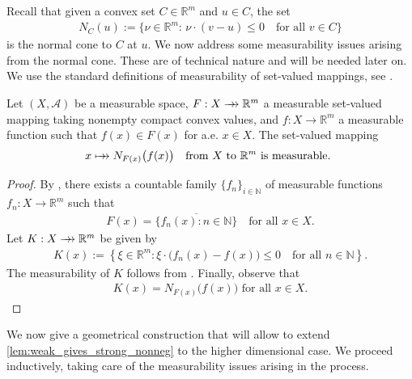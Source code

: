 \documentclass[hidelinks,onefignum,onetabnum]{siamart220329}
\newcommand{\rrightarrow}{\mathrel{\mathrlap{\rightarrow}\mkern1mu\rightarrow}}
\let\twoheadrightarrow\rrightarrow
\newcommand{\mapsmto}{\mathrel{\mathrlap{\mapsto}\mkern1mu\rightarrow}}
\begin{document}
Recall that given a convex set $C\in\mathbb R^m$ and $u\in C$, the set 
	\begin{align*}
		N_{C}(u):=\{\nu\in\mathbb R^m:\, \nu\cdot (v-u)\le0\quad\text{for all $v\in C$}\}
	\end{align*}
	is the normal cone to $C$ at $u$. We now address some measurability issues arising from the normal cone. These are of  technical nature and will be needed later on. 
	We use the standard definitions of measurability of set-valued mappings, see  \cite[Definition 6.2.1]{Anhand}.
\begin{lemma}\label{measissues}
		Let $(X,\mathcal A)$ be a measurable space,  $F:X\twoheadrightarrow \mathbb R^m$ a measurable set-valued mapping taking nonempty compact convex values, and $f:X\to\mathbb R^m$ a measurable function such that $f(x)\in F(x)$ for a.e. $x\in X$.
		The set-valued mapping 
	\begin{align*}
		x\mapsmto N_{F(x)}\big(f(x)\big)\quad \text{from $X$ to $\mathbb R^m$ is measurable. }
	\end{align*}
\end{lemma}
\begin{proof}
	By \cite[Corollary 18.15]{Infdim}, there exists a countable family $\{f_{n}\}_{i\in\mathbb N}$ of measurable functions $f_n:X\to\mathbb R^m$ such that 
	\begin{align*}
		F(x)=\overline{\{f_{n}(x):n\in\mathbb N\}}\quad\text{for all $x\in X$.}
	\end{align*}
	Let $K:X\twoheadrightarrow\mathbb R^m$ be given by
	\begin{align*}
			K(x):=\left\lbrace \xi\in\mathbb R^m: \xi\cdot\big(f_{n}(x)-f(x)\big)\le0\quad\text{for all $n\in\mathbb N$}\right\rbrace.
	\end{align*}
The measurability of $K$ follows from \cite[Theorem 3]{Measconv}. Finally, observe that 
\begin{align*}
	\text{$K(x)=N_{F(x)}\big(f(x)\big)$ for all $x\in X$}. 
\end{align*}
\end{proof}


We now give a geometrical construction that will allow to extend \cref{lem:weak_gives_strong_nonneg} to the higher dimensional case. We proceed inductively, taking care of the measurability issues arising in the process.
\end{document}
